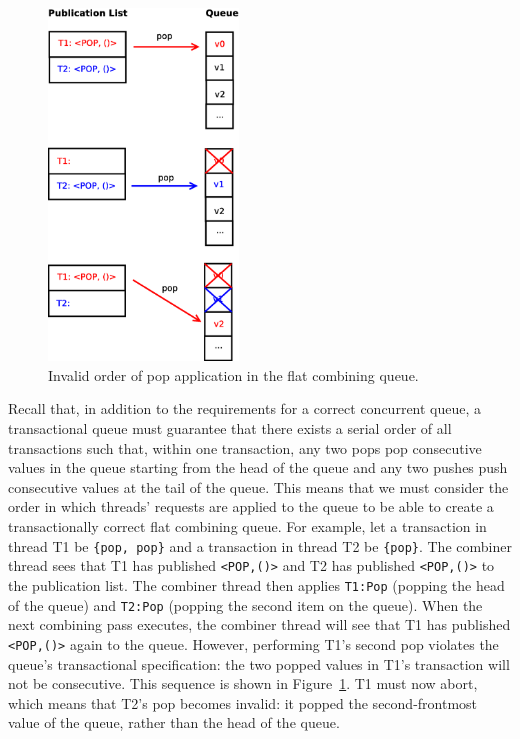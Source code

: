 \begin{figure}[t]
\centering
\includegraphics[width=0.45\textwidth]{fcqueue_publist}
\caption{Invalid order of pop application in the flat combining queue.}
\label{fig:fcqueue_publist}
\end{figure}

Recall that, in addition to the requirements for a correct concurrent queue, a transactional queue must guarantee that there exists a serial order of all transactions such that, within one transaction, any two pops pop consecutive values in the queue starting from the head of the queue and any two pushes push consecutive values at the tail of the queue.
This means that we must consider the order in which threads' requests are applied to the queue to be able to create a transactionally correct flat combining queue. For example, let a transaction in thread T1 be \texttt{\{pop, pop\}} and a transaction in thread T2 be \texttt{\{pop\}}. The combiner thread sees that T1 has published \texttt{<POP,()>} and T2 has published \texttt{<POP,()>} to the publication list. The combiner thread then applies \texttt{T1:Pop} (popping the head of the queue) and \texttt{T2:Pop} (popping the second item on the queue). When the next combining pass executes, the combiner thread will see that T1 has published \texttt{<POP,()>} again to the queue. However, performing T1's second pop violates the queue's transactional specification: the two popped values in T1's transaction will not be consecutive. This sequence is shown in Figure~\ref{fig:fcqueue_publist}. T1 must now abort, which means that T2's pop becomes invalid: it popped the second-frontmost value of the queue, rather than the head of the queue.

